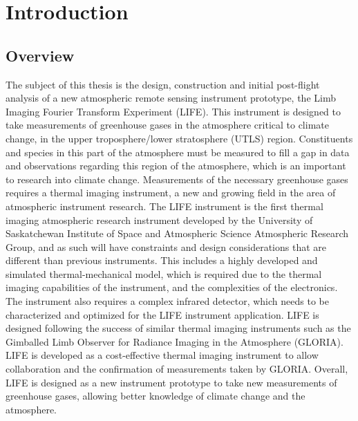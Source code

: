 \chapter{Introduction}

\section{Overview}
The subject of this thesis is the design, construction and initial post-flight analysis of a new atmospheric remote sensing instrument prototype, the Limb Imaging Fourier Transform Experiment (LIFE). This instrument is designed to take measurements of greenhouse gases in the atmosphere critical to climate change, in the upper troposphere/lower stratosphere (UTLS) region. Constituents and species in this part of the atmosphere must be measured to fill a gap in data and observations regarding this region of the atmosphere, which is an important to research into climate change. Measurements of the necessary greenhouse gases requires a thermal imaging instrument, a new and growing field in the area of atmospheric instrument research. The LIFE instrument is the first thermal imaging atmospheric research instrument developed by the University of Saskatchewan Institute of Space and Atmospheric Science Atmospheric Research Group, and as such will have constraints and design considerations that are different than previous instruments. This includes a highly developed and simulated thermal-mechanical model, which is required due to the thermal imaging capabilities of the instrument, and the complexities of the electronics. The instrument also requires a complex infrared detector, which needs to be characterized and optimized for the LIFE instrument application. LIFE is designed following the success of similar thermal imaging instruments such as the Gimballed Limb Observer for Radiance Imaging in the Atmosphere (GLORIA). LIFE is developed as a cost-effective thermal imaging instrument to allow collaboration and the confirmation of measurements taken by GLORIA. Overall, LIFE is designed as a new instrument prototype to take new measurements of greenhouse gases, allowing better knowledge of climate change and the atmosphere.


